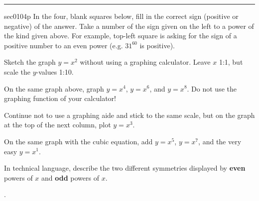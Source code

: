 \renewcommand{\columnseprule}{1.5pt}
\begin{multicols*}{2}
\rule[0.5\baselineskip]{0.4\textwidth}{1pt}
\noindent
{}\label{sec0104p}
\begin{exercises}{sec0104p}
\lab{}In the four, blank squares below, fill in the correct sign (positive or negative) of the answer.
Take a number of the sign given on the left to a power of the kind given above.  For example, 
top-left square is asking for the sign of a positive number to an even power (e.g. $31^{60}$ is positive).

\noindent
{}

\lab{}Sketch the graph $y=x^2$ without using a graphing calculator.  Leave $x$ 1:1, but scale 
the $y$-values 1:10.

\noindent
\begin{centering}
\end{centering}

\lab{}On the same graph above, graph $y=x^4$, $y=x^6$, and $y=x^8$.  Do not use the graphing
function of your calculator!


\lab{}Continue not to use a graphing aide and stick to the same scale, but on the graph at the top of the next column, plot $y=x^3$.
 
\lab{}On the same graph with the cubic equation, add $y=x^5$, $y=x^7$, and the very
easy $y=x^1$.

\lab{}In technical language, describe the two different symmetries displayed by \textbf{even} powers of
$x$ and \textbf{odd} powers of $x$. 

\vspace{1.2cm}
.

\noindent
{}


\end{exercises}
\end{multicols*}
